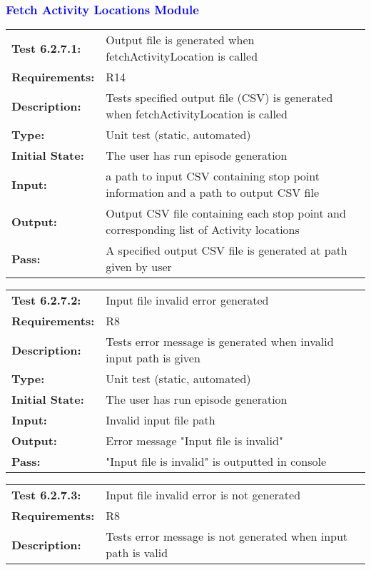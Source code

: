 \documentclass[12pt, titlepage]{article}
\begin{document}
\textcolor{blue}{
\subsubsection{Fetch Activity Locations Module}
\begin{tabular}{|l|p{10cm}|}
    \hline
    \bf{Test} 6.2.7.1: & Output file is generated when fetchActivityLocation is called\\
    \bf{Requirements}: &  R14\\
    \bf{Description}: & Tests specified output file (CSV) is generated when fetchActivityLocation is called\\
    \bf{Type}: & Unit test (static, automated) \\
    \bf{Initial State}: & The user has run episode generation\\
    \bf{Input}: & a path to input CSV containing stop point information and a path to output CSV file \\
    \bf{Output}: & Output CSV file containing each stop point and corresponding list of Activity locations\\
    \bf{Pass}: & A specified output CSV file is generated at path given by user \\
    \hline
\end{tabular}
\begin{tabular}{|l|p{10cm}|}
    \hline
    \bf{Test} 6.2.7.2: & Input file invalid error generated\\
    \bf{Requirements}: &  R8\\
    \bf{Description}: & Tests error message is generated when invalid input path is given\\
    \bf{Type}: & Unit test (static, automated) \\
    \bf{Initial State}: & The user has run episode generation\\
    \bf{Input}: & Invalid input file path \\
    \bf{Output}: & Error message "Input file is invalid" \\
    \bf{Pass}: & "Input file is invalid" is outputted in console \\
    \hline
\end{tabular}
\begin{tabular}{|l|p{10cm}|}
    \hline
    \bf{Test} 6.2.7.3: & Input file invalid error is not generated\\
    \bf{Requirements}: & R8\\
    \bf{Description}: & Tests error message is not generated when input path is valid\\

\end{tabular}}
\end{document}
